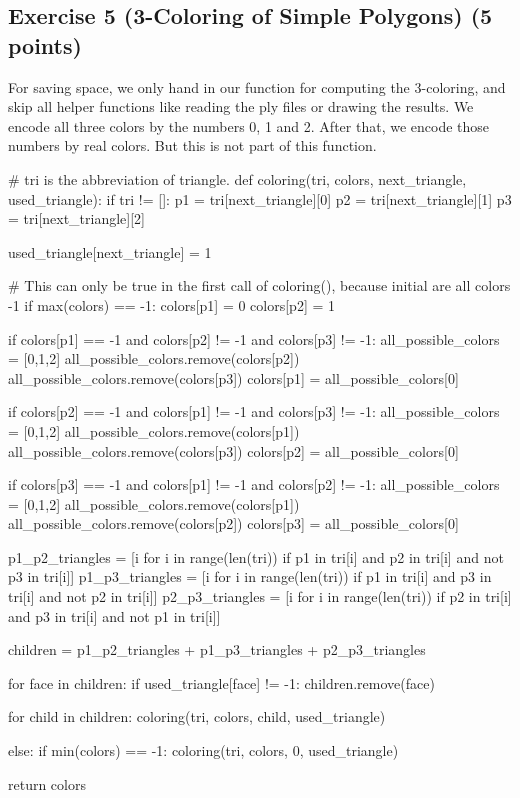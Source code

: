 \documentclass[english, fontsize=12pt, paper=a4, twoside=false, draft=true, pagesize=auto, version=last, DIV=16]{scrartcl}
\theoremstyle{break}
\begin{document}
\begin{landscape}
\section*{Exercise 5 (3-Coloring of Simple Polygons) {\large \hfill (5 points)}}
For saving space, we only hand in our function for computing the 3-coloring, and skip all helper functions like reading the ply files or drawing the results. We encode all three colors by the numbers 0, 1 and 2. After that, we encode those numbers by real colors. But this is not part of this function. \par
\bigskip

\begin{python}
# tri is the abbreviation of triangle.
def coloring(tri, colors, next_triangle, used_triangle):
    if tri != []:
        p1 = tri[next_triangle][0]
        p2 = tri[next_triangle][1]
        p3 = tri[next_triangle][2]

        used_triangle[next_triangle] = 1

        # This can only be true in the first call of coloring(), because initial are all colors -1
        if max(colors) == -1:
            colors[p1] = 0
            colors[p2] = 1

        if colors[p1] == -1 and colors[p2] != -1 and colors[p3] != -1:
            all_possible_colors = [0,1,2]
            all_possible_colors.remove(colors[p2])
            all_possible_colors.remove(colors[p3])
            colors[p1] = all_possible_colors[0]

        if colors[p2] == -1 and colors[p1] != -1 and colors[p3] != -1:
            all_possible_colors = [0,1,2]
            all_possible_colors.remove(colors[p1])
            all_possible_colors.remove(colors[p3])
            colors[p2] = all_possible_colors[0]

        if colors[p3] == -1 and colors[p1] != -1 and colors[p2] != -1:
            all_possible_colors = [0,1,2]
            all_possible_colors.remove(colors[p1])
            all_possible_colors.remove(colors[p2])
            colors[p3] = all_possible_colors[0]

        p1_p2_triangles = [i for i in range(len(tri)) if p1 in tri[i] and p2 in tri[i] and not p3 in tri[i]]
        p1_p3_triangles = [i for i in range(len(tri)) if p1 in tri[i] and p3 in tri[i] and not p2 in tri[i]]
        p2_p3_triangles = [i for i in range(len(tri)) if p2 in tri[i] and p3 in tri[i] and not p1 in tri[i]]

        children = p1_p2_triangles + p1_p3_triangles + p2_p3_triangles

        for face in children:
            if used_triangle[face] != -1:
                children.remove(face)

        for child in children:
            coloring(tri, colors, child, used_triangle)

    else:
        if min(colors) == -1:
            coloring(tri, colors, 0, used_triangle)

    return colors
\end{python}
\end{landscape}
\newpage
\end{document}
